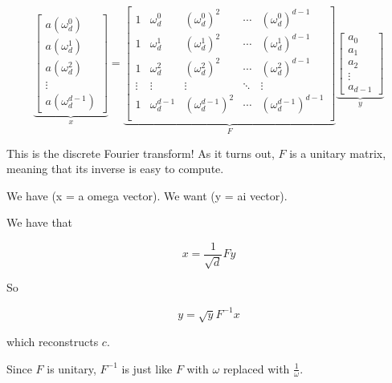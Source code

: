 \documentclass[12pt]{article}
\begin{document}
\begin{enumerate}
      \[
        \underbrace {
          \begin{bmatrix}
            a(\omega_d^0) \\
            a(\omega_d^1) \\
            a(\omega_d^2) \\
            \vdots \\
            a(\omega_d^{d - 1})
          \end{bmatrix}
        }_{x}
        =
        \underbrace{
          \begin{bmatrix}
            1 & \omega_d^0 & \left( \omega_d^0 \right)^2 & \cdots & \left( \omega_d^0 \right)^{d - 1} \\
            1 & \omega_d^1 & \left( \omega_d^1 \right)^2 & \cdots & \left( \omega_d^1 \right)^{d - 1} \\
            1 & \omega_d^2 & \left( \omega_d^2 \right)^2 & \cdots & \left( \omega_d^2 \right)^{d - 1} \\
            \vdots & \vdots & \vdots & \ddots & \vdots \\
            1 & \omega_d^{d - 1} & \left( \omega_d^{d - 1} \right)^2 & \cdots & \left( \omega_d^{d - 1} \right)^{d - 1} \\
          \end{bmatrix}
        }_{F}
        \underbrace{
          \begin{bmatrix}
            a_0 \\
            a_1 \\
            a_2 \\
            \vdots \\
            a_{d - 1}
          \end{bmatrix}
        }_{y}
      \]

      This is the discrete Fourier transform! As it turns out, $F$ is a unitary
      matrix, meaning that its inverse is easy to compute.

      We have (x = a omega vector). We want (y = ai vector).

      We have that

      \[
        x = \frac{1}{\sqrt{d}} F y
      \]

      So

      \[
        y = \sqrt{y} F^{-1} x
      \]

      which reconstructs $c$.

      Since $F$ is unitary, $F^{-1}$ is just like $F$ with $\omega$ replaced
      with $\frac{1}{\omega}$.

  \end{enumerate}
\end{document}
